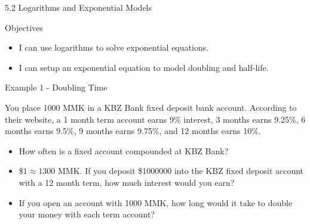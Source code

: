 \documentclass[ignorenonframetext,]{beamer}
\providecommand{\tightlist}{%
  \setlength{\itemsep}{0pt}\setlength{\parskip}{0pt}}
\begin{document}
\begin{frame}{5.2 Logarithms and Exponential Models}

\begin{block}{Objectives}

\begin{itemize}
\tightlist
\item
  I can use logarithms to solve exponential equations.
\item
  I can setup an exponential equation to model doubling and half-life.
\end{itemize}

\end{block}

\end{frame}

\begin{frame}{Example 1 - Doubling Time}

You place 1000 MMK in a KBZ Bank fixed deposit bank account. According
to their website, a 1 month term account earns 9\% interest, 3 months
earns 9.25\%, 6 months earns 9.5\%, 9 months earns 9.75\%, and 12 months
earns 10\%.

\begin{itemize}
\tightlist
\item
  How often is a fixed account compounded at KBZ Bank?
\item
  \(\$ 1 \approx 1300\) MMK. If you deposit \$1000000 into the KBZ fixed
  deposit account with a 12 month term, how much interest would you
  earn?
\item
  If you open an account with 1000 MMK, how long would it take to double
  your money with each term account?
\end{itemize}

\end{frame}
\end{document}
